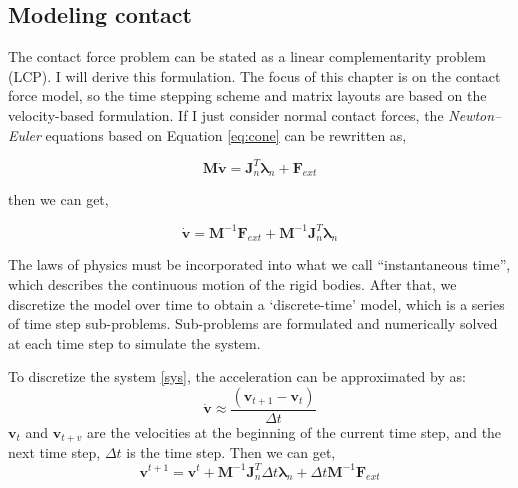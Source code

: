 \subsection{Modeling contact}
    The contact force problem can be stated as a linear complementarity problem (LCP)\cite{bender2014interactive}. I will derive this formulation. The focus of this chapter is on the contact force model, so the time stepping scheme and matrix layouts are based on the velocity-based formulation. If I just consider normal contact forces, the \textit{Newton–Euler} equations based on Equation \ref{eq:cone} can be rewritten as,

    \begin{equation}
        \pmb{M}\dot{\mathbf{v}} = \pmb{J}_{n}^{T}\pmb{\lambda}_n + \mathbf{F}_{ext}
    \end{equation}

    then we can get,

    \begin{equation}
        \dot{\mathbf{v}} = \pmb{M}^{-1}\mathbf{F}_{ext} + \pmb{M}^{-1}\pmb{J}_{n}^{T}\pmb{\lambda}_{n}
        \label{sys}
    \end{equation}

    The laws of physics must be incorporated into what we call ``instantaneous time'', which describes the continuous motion of the rigid bodies. After that, we discretize the model over time to obtain a `discrete-time' model, which is a series of time step sub-problems. Sub-problems are formulated and numerically solved at each time step to simulate the system.
    
    To discretize the system \ref{sys}, the acceleration can be approximated by \cite{anitescu1997modeling} as:
    \begin{equation}
        \dot{\mathbf{v}} \approx \frac{(\mathbf{v}_{t+1} - \mathbf{v}_t)}{\Delta t}
    \end{equation}
    $\mathbf{v}_t$ and $\mathbf{v}_{t+v}$ are the velocities at the beginning of the current time step, and the next time step, $\Delta t$ is the time step. Then we can get,
    \begin{equation}
        \mathbf{v}^{t+1} = \mathbf{v}^{t} + \pmb{M}^{-1}\pmb{J}_{n}^{T}\Delta{t}\pmb{\lambda}_{n} + \Delta{t}\pmb{M}^{-1}\mathbf{F}_{ext}
    \end{equation}

